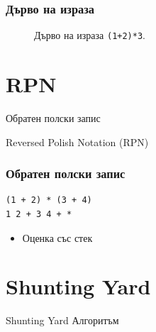 \documentclass{beamer}
\begin{document}
\begin{frame}[fragile]
  \frametitle{Дърво на израза}

  \begin{figure}
    \centering
    \caption{Дърво на израза \texttt{(1+2)*3}.}
    \label{fig:treeexpr}
    \end{figure}
    

  
\end{frame}
  


\section{RPN} 


\begin{frame}
\centerline{Обратен полски запис}
\centerline{Reversed Polish Notation (RPN)}
\end{frame}

\begin{frame}[fragile]
\frametitle{Обратен полски запис}
\begin{verbatim}
(1 + 2) * (3 + 4)
1 2 + 3 4 + *  
\end{verbatim}

\begin{itemize}
  \item Оценка със стек
\end{itemize}

\end{frame}



\section{Shunting Yard} 

\begin{frame}
\centerline{Shunting Yard Алгоритъм}
\end{frame}
\end{document}
